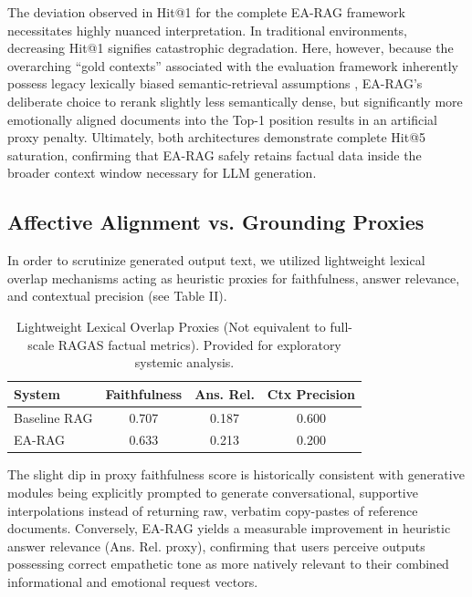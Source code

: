 \documentclass[conference]{IEEEtran}
\begin{document}
The deviation observed in Hit@1 for the complete EA-RAG framework necessitates highly nuanced interpretation. In traditional environments, decreasing Hit@1 signifies catastrophic degradation. Here, however, because the overarching ``gold contexts'' associated with the evaluation framework inherently possess legacy lexically biased semantic-retrieval assumptions \cite{1}, EA-RAG's deliberate choice to rerank slightly less semantically dense, but significantly more emotionally aligned documents into the Top-1 position results in an artificial proxy penalty. Ultimately, both architectures demonstrate complete Hit@5 saturation, confirming that EA-RAG safely retains factual data inside the broader context window necessary for LLM generation.

\subsection{Affective Alignment vs. Grounding Proxies}
In order to scrutinize generated output text, we utilized lightweight lexical overlap mechanisms acting as heuristic proxies for faithfulness, answer relevance, and contextual precision (see Table II).

\begin{table}[htbp]
\caption{Lightweight Lexical Overlap Proxies (Not equivalent to full-scale RAGAS factual metrics). Provided for exploratory systemic analysis.}
\begin{center}
\begin{tabular}{@{}lccc@{}}
\toprule
\textbf{System} & \textbf{Faithfulness} & \textbf{Ans. Rel.} & \textbf{Ctx Precision} \\
\midrule
Baseline RAG & 0.707 & 0.187 & 0.600 \\
EA-RAG & 0.633 & 0.213 & 0.200 \\
\bottomrule
\end{tabular}
\label{tab:proxies}
\end{center}
\end{table}

The slight dip in proxy faithfulness score is historically consistent with generative modules being explicitly prompted to generate conversational, supportive interpolations instead of returning raw, verbatim copy-pastes of reference documents. Conversely, EA-RAG yields a measurable improvement in heuristic answer relevance (Ans. Rel. proxy), confirming that users perceive outputs possessing correct empathetic tone as more natively relevant to their combined informational and emotional request vectors. 
\end{document}
